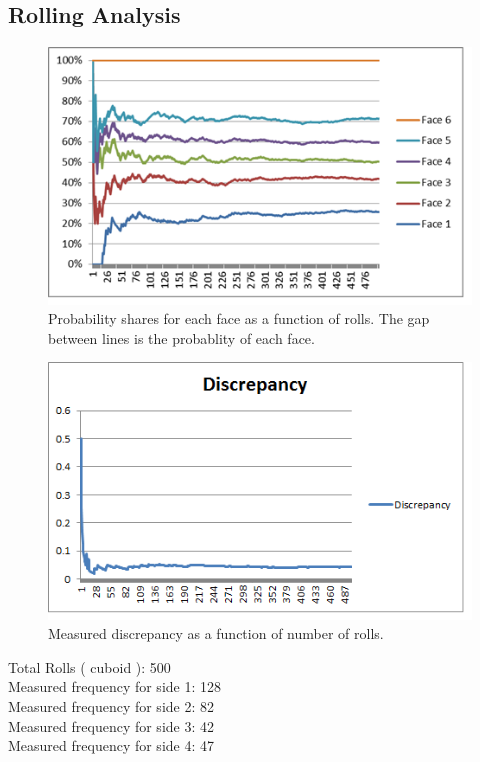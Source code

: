 \subsection{Rolling Analysis}
\begin{figure}[h]
\center
\includegraphics[scale=1]{cuboid_graph.png}
\caption{Probability shares for each face as a function of rolls. The gap between lines is the probablity of each face.}
\label{fig:cuboid}
\end{figure}
\begin{figure}[h]
\center
\includegraphics[scale=1]{cuboid_di.png}
\caption{Measured discrepancy as a function of number of rolls.}
\label{fig:cuboid}
\end{figure}
Total Rolls ( cuboid ): 500\\
Measured frequency for side 1: 128\\
Measured frequency for side 2: 82\\
Measured frequency for side 3: 42\\
Measured frequency for side 4: 47\\
